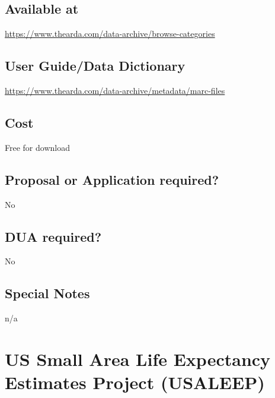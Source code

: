 \documentclass[
]{book}
\begin{document}
\hypertarget{available-at-95}{%
\section{Available at}\label{available-at-95}}

\url{https://www.thearda.com/data-archive/browse-categories}

\hypertarget{user-guidedata-dictionary-95}{%
\section{User Guide/Data Dictionary}\label{user-guidedata-dictionary-95}}

\url{https://www.thearda.com/data-archive/metadata/marc-files}

\hypertarget{cost-95}{%
\section{Cost}\label{cost-95}}

Free for download

\hypertarget{proposal-or-application-required-95}{%
\section{Proposal or Application required?}\label{proposal-or-application-required-95}}

No

\hypertarget{dua-required-95}{%
\section{DUA required?}\label{dua-required-95}}

No

\hypertarget{special-notes-95}{%
\section{Special Notes}\label{special-notes-95}}

n/a

\mainmatter

\hypertarget{us-small-area-life-expectancy-estimates-project-usaleep}{%
\chapter{US Small Area Life Expectancy Estimates Project (USALEEP)}\label{us-small-area-life-expectancy-estimates-project-usaleep}}
\end{document}
